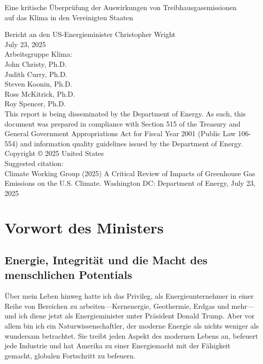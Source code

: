 \documentclass[12pt,paper=a4,DIV=12,parskip=never,chapterprefix=false,headings=standardclasses]{scrreprt}
\makeatletter
\numberwithin{figure}{chapter}
\renewcommand*{\tableofcontents}{%
  \begingroup
    \small      %
    \sloppy     %
    \chapter*{\contentsname}%
    \@starttoc{toc}%
  \endgroup
}
\makeatother
\begin{document}
\begin{titlepage}
\centering
{\huge Eine kritische Überprüfung der Auswirkungen von Treibhausgasemissionen\\
auf das Klima in den Vereinigten Staaten\par}

\vspace{1.5cm}
\raggedright
{\Large Bericht an den US-Energieminister Christopher Wright}\\[2ex]
{\Large July 23, 2025}\\[2cm]

{\large Arbeitsgruppe Klima:}\\[0.7cm]
John Christy, Ph.D.\\
Judith Curry, Ph.D.\\
Steven Koonin, Ph.D.\\
Ross McKitrick, Ph.D.\\
Roy Spencer, Ph.D.\\[2cm]

This report is being disseminated by the Department of Energy. As such, this document was prepared
in compliance with Section 515 of the Treasury and General Government Appropriations Act for
Fiscal Year 2001 (Public Law 106-554) and information quality guidelines issued by the Department
of Energy.\\[3ex]

Copyright © 2025 United States\\[3ex]

Suggested citation:\\[1ex]

Climate Working Group (2025) A Critical Review of Impacts of Greenhouse Gas Emissions on the
U.S. Climate. Washington DC: Department of Energy, July 23, 2025
\end{titlepage}

\newpage
\thispagestyle{empty}
\mbox{}
\newpage

\tableofcontents
\cleardoublepage
{}   %
\chapter*{Vorwort des Ministers}
\section*{Energie, Integrität und die Macht des menschlichen Potentials}
Über mein Leben hinweg hatte ich das Privileg, als Energieunternehmer in einer Reihe von Bereichen zu arbeiten—Kernenergie, Geothermie, Erdgas und mehr—und ich diene jetzt als Energieminister unter Präsident Donald Trump. Aber vor allem bin ich ein Naturwissenschaftler, der moderne Energie als nichts weniger als wundersam betrachtet. Sie treibt jeden Aspekt des modernen Lebens an, befeuert jede Industrie und hat Amerika zu einer Energiemacht mit der Fähigkeit gemacht, globalen Fortschritt zu befeuern.
\end{document}

